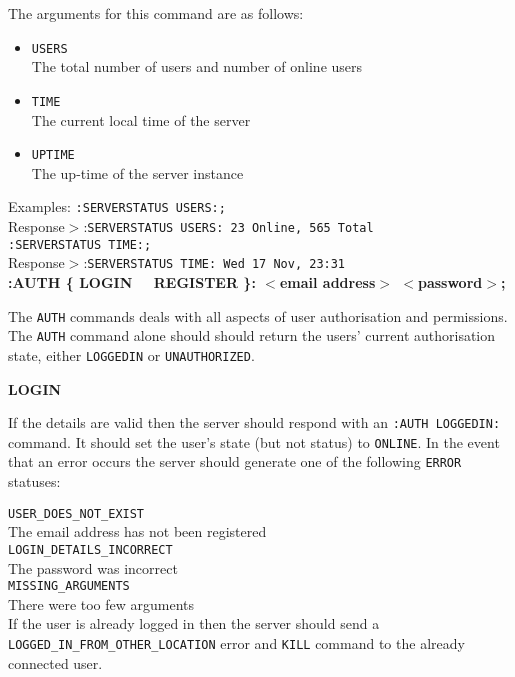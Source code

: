 The arguments for this command are as follows:

\begin{itemize}

\item{ \texttt{USERS} \\
The total number of users and number of online users}

\item{ \texttt{TIME} \\
The current local time of the server}

\item{ \texttt{UPTIME} \\
The up-time of the server instance}

\end{itemize}

Examples:
\texttt{:SERVERSTATUS USERS:;} \\
Response$>$:\texttt{SERVERSTATUS USERS: 23 Online, 565 Total} \\
\texttt{:SERVERSTATUS TIME:;} \\
Response$>$:\texttt{SERVERSTATUS TIME: Wed 17 Nov, 23:31} \\

{\bf :AUTH \{ LOGIN \ \vline \ REGISTER \}: $<$email address$>$ $<$password$>$;}

The \texttt{AUTH} commands deals with all aspects of user authorisation and permissions. The \texttt{AUTH} command alone should should return the users' current authorisation state, either \texttt{LOGGEDIN} or \texttt{UNAUTHORIZED}.

{\bf LOGIN}

If the details are valid then the server should respond with an \texttt{:AUTH LOGGEDIN:} command. It should set the user’s state (but not status) to \texttt{ONLINE}.
In the event that an error occurs the server should generate one of the following \texttt{ERROR} statuses:

\texttt{USER\_DOES\_NOT\_EXIST}\\
The email address has not been registered \\
\texttt{LOGIN\_DETAILS\_INCORRECT} \\
The password was incorrect \\
\texttt{MISSING\_ARGUMENTS} \\
There were too few arguments \\

If the user is already logged in then the server should send a \texttt{LOGGED\_IN\_FROM\_OTHER\_LOCATION} error and \texttt{KILL} command to the already connected user.


